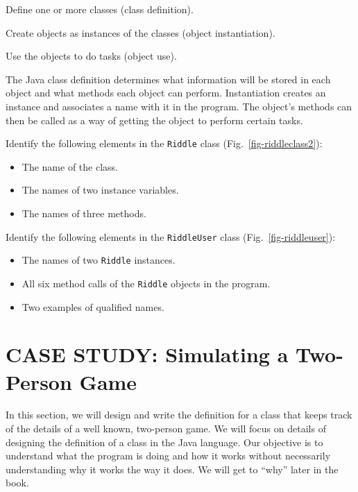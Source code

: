 \begin{BL}
\item  Define one or more classes (class definition).
\item  Create objects as instances of the classes (object instantiation).
\item  Use the objects to do tasks (object use).
\end{BL}

\noindent The Java class definition determines what
information will be stored in each object and what methods each object
can perform.  Instantiation creates an instance and associates a name
with it in the program.  The object's methods can then be called as a
way of getting the object to perform certain tasks.

\pagebreak
{}
\begin{SSTUDY}

\item
Identify the following elements in the {\tt Riddle} class
(Fig.~\ref{fig-riddleclass2}):

\begin{itemize}
\item  The name of the class.
\item  The names of two instance variables.
\item  The names of three methods.
\end{itemize}


\item
Identify the following elements in the {\tt RiddleUser} class
(Fig.~\ref{fig-riddleuser}):

\begin{itemize}
\item  The names of two {\tt Riddle} instances.
\item  All six method calls of the {\tt Riddle} objects in the program.
\item  Two examples of qualified names.
\end{itemize}

\end{SSTUDY}


\section{CASE STUDY: Simulating a Two-Person Game}
\label{casestudy-simulatinga-two-person-game}
\noindent In this section, we will design and write the definition
for a class that keeps track of the details of a well known, two-person
game. We will focus on details of designing the definition of a class
in the Java language.  Our objective is to understand what the program
is doing and how it works without necessarily understanding why it
works the way it does.  We will get to ``why'' later in the book.

